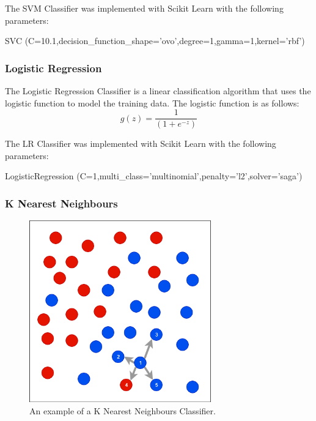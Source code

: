 The SVM Classifier was implemented with Scikit Learn with the following parameters:

\begin{tcolorbox}
\begin{center}
	SVC (C=10.1,decision\_function\_shape='ovo',degree=1,gamma=1,kernel='rbf')
\end{center}
\end{tcolorbox}

\subsubsection*{Logistic Regression}

The Logistic Regression Classifier is a linear classification algorithm that uses the logistic function to model the training data. The logistic function is as follows:
\begin{equation}
  g(z)= \frac{1}{(1+e^{-z})}  
\end{equation}

The LR Classifier was implemented with Scikit Learn with the following parameters:

\begin{tcolorbox}
\begin{center}
	LogisticRegression (C=1,multi\_class='multinomial',penalty='l2',solver='saga')
\end{center}
\end{tcolorbox}

\subsubsection*{K Nearest Neighbours}

\begin{figure}[h!]
\centering
\includegraphics[width=0.7\textwidth]{design_and_methodology/knn.png}
\caption{\label{fig:knn} An example of a K Nearest Neighbours Classifier.}
\end{figure}

